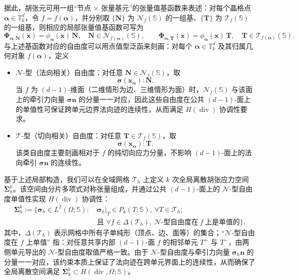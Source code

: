 据此，胡张元可用一组“节点 $\times$ 张量基元”的张量值基函数来表述：对每个晶格点 $\boldsymbol{\alpha}\in\mathbb{T}_k^d$，令 $f=f(\boldsymbol{\alpha})$，并分别取 $\{ \boldsymbol{N}\}$ 为 $\mathcal{N}_{f}(\mathbb{S})$ 的一组基、$\{\boldsymbol{T}\}$ 为 $\mathcal{T}_{f}(\mathbb{S})$ 的一组基，则相应的局部张量值基函数可写为
\[
\boldsymbol{\Phi}_{\boldsymbol{\alpha},\boldsymbol{N}}(\boldsymbol{x})=\phi_{\boldsymbol{\alpha}}(\boldsymbol{x})\,\boldsymbol{N},\quad \boldsymbol{N}\in\mathcal{N}_{f(\boldsymbol{\alpha})}(\mathbb{S}), \qquad \boldsymbol{\Phi}_{\boldsymbol{\alpha},\boldsymbol{T}}(\boldsymbol{x})=\phi_{\boldsymbol{\alpha}}(\boldsymbol{x})\,\boldsymbol{T},\quad \boldsymbol{T}\in\mathcal{T}_{f(\boldsymbol{\alpha})}(\mathbb{S}).
\]
与上述基函数对应的自由度可以用点值型泛函来刻画：对每个 $\boldsymbol{\alpha}\in\mathbb{T}_k^d$ 及其归属几何对象 $f(\boldsymbol{\alpha})$，定义
\begin{itemize}
	\item $\mathcal{N}$-型（法向相关）自由度：对任意 $\boldsymbol{N}\in\mathcal{N}_{f}(\mathbb{S})$，取
	\[
	\boldsymbol{\sigma}(\boldsymbol{x}_{\boldsymbol{\alpha}}):\boldsymbol{N}.
	\]
	当 $f$ 为 $(d-1)$-维面（二维情形为边、三维情形为面）时，$\mathcal{N}_{f}(\mathbb{S})$ 与该面上的牵引力向量 $\boldsymbol{\sigma}\boldsymbol{n}$ 的分量一一对应，因此这些自由度在公共 $(d-1)$-面上的单值性可保证跨单元边界法向迹的连续性，从而满足 $H(\operatorname{div})$ 协调性要求。
	
	\item $\mathcal{T}$-型（切向相关）自由度：对任意 $\boldsymbol{T}\in\mathcal{T}_{f}(\mathbb{S})$，取
	\[
	\boldsymbol{\sigma}(\boldsymbol{x}_{\boldsymbol{\alpha}}):\boldsymbol{T}.
	\]
	该类自由度主要刻画相对于 $f$ 的纯切向应力分量，不影响 $(d-1)$-面上的法向牵引 $\boldsymbol{\sigma}\boldsymbol{n}$ 的连续性。
\end{itemize}

基于上述局部构造，我们可以在全域网格 $\mathcal{T}_h$ 上定义 $k$ 次全局离散胡张应力空间 $\boldsymbol{\Sigma}_h^k$。该空间由分片多项式对称张量组成，并通过公共 $(d-1)$-面上的 $\mathcal{N}$-型自由度单值性实现 $H(\operatorname{div})$ 协调性：
\begin{equation} \label{eq:ch5_hz_global_stress_space}
	\begin{aligned} 
		\boldsymbol{\Sigma}_h^k := \Big\{ \boldsymbol{\sigma}_h \in L^2(\Omega; \mathbb{S}) : \ & \boldsymbol{\sigma}_h|_T \in P_k(T; \mathbb{S}), \ \forall T \in \mathcal{T}_h; \\ & \text{且 } \forall f \in \Delta(\mathcal{T}_h), \ \mathcal{N}\text{-型自由度在}~f~\text{上是单值的} \Big\}. 
	\end{aligned}
\end{equation}
其中，$\Delta(\mathcal{T}_h)$ 表示网格中所有子单纯形（顶点、边、面等）的集合；“$\mathcal{N}$-型自由度在 $f$ 上单值” 指：对任意共享内部 $(d-1)$-面 $f$ 的相邻单元 $T^+$ 与 $T^-$，由两侧单元导出的 $\mathcal{N}$-型自由度取值严格一致。由于 $\mathcal{N}$-型自由度与牵引力向量 $\boldsymbol{\sigma}_h\boldsymbol{n}$ 的分量一一对应，该约束本质上保证了法向迹在跨单元界面上的连续性，从而确保了全局离散空间满足 $\boldsymbol{\Sigma}_h^k \subset H(\operatorname{div},\Omega;\mathbb{S})$。

